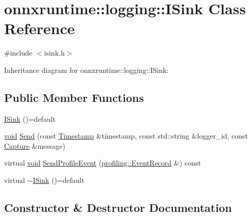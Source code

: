 \hypertarget{classonnxruntime_1_1logging_1_1ISink}{}\section{onnxruntime\+:\+:logging\+:\+:I\+Sink Class Reference}
\label{classonnxruntime_1_1logging_1_1ISink}


{\ttfamily \#include $<$isink.\+h$>$}



Inheritance diagram for onnxruntime\+:\+:logging\+:\+:I\+Sink\+:
\subsection*{Public Member Functions}
\begin{DoxyCompactItemize}
\item 
\mbox{\hyperlink{classonnxruntime_1_1logging_1_1ISink_a3b5949b3a4ab6a7050648a842d34d54d}{I\+Sink}} ()=default
\item 
\mbox{\hyperlink{mlasi_8h_a88f941d423cb2a819b70a1358982b1a6}{void}} \mbox{\hyperlink{classonnxruntime_1_1logging_1_1ISink_a9460947ff02092785dbb4ee7ddddcb4a}{Send}} (const \mbox{\hyperlink{namespaceonnxruntime_1_1logging_ae7a2a84f622a028e2ad495a74289012d}{Timestamp}} \&timestamp, const std\+::string \&logger\+\_\+id, const \mbox{\hyperlink{classonnxruntime_1_1logging_1_1Capture}{Capture}} \&message)
\item 
virtual \mbox{\hyperlink{mlasi_8h_a88f941d423cb2a819b70a1358982b1a6}{void}} \mbox{\hyperlink{classonnxruntime_1_1logging_1_1ISink_ad46a3448fabc1672e5cb8427f16f1910}{Send\+Profile\+Event}} (\mbox{\hyperlink{structonnxruntime_1_1profiling_1_1EventRecord}{profiling\+::\+Event\+Record}} \&) const
\item 
virtual \mbox{\hyperlink{classonnxruntime_1_1logging_1_1ISink_a30082194671f1a1a612ff29d10e00d42}{$\sim$\+I\+Sink}} ()=default
\end{DoxyCompactItemize}


\subsection{Constructor \& Destructor Documentation}
\mbox{\label{classonnxruntime_1_1logging_1_1ISink_a3b5949b3a4ab6a7050648a842d34d54d}} 
